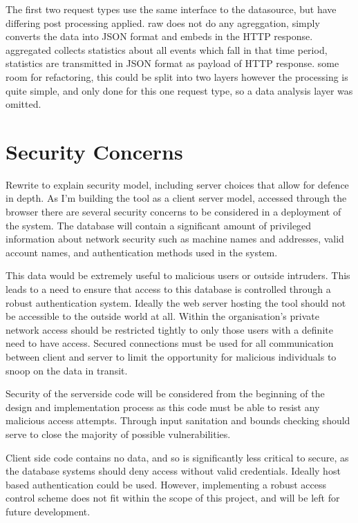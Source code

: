 The first two request types use the same interface to the datasource, but have differing post processing applied. raw does not do any agreggation, simply converts the data into JSON format and embeds in the HTTP response. aggregated collects statistics about all events which fall in that time period, statistics are transmitted in JSON format as payload of HTTP response.
some room for refactoring, this could be split into two layers
however the processing is quite simple, and only done for this one request type, so a data analysis layer was omitted.

\section{Security Concerns}
Rewrite to explain security model, including server choices that allow for defence in depth.
As I'm building the tool as a client server model, accessed through the browser
there are several security concerns to be considered in a deployment of the system.
The database will contain a significant amount of privileged information about network security
such as machine names and addresses, valid account names, and authentication methods used in the system.

This data would be extremely useful to malicious users or outside intruders. 
This leads to a need to ensure that access to this database is controlled through a robust authentication system.
Ideally the web server hosting the tool should not be accessible to the outside world at all. Within the organisation's private network access should be restricted tightly to only those users with a definite need to have access. 
Secured connections must be used for all communication between client and server to limit the opportunity for malicious individuals to snoop on the data in transit.

Security of the serverside code will be considered from the beginning of the design and implementation process
as this code must be able to resist any malicious access attempts. Through input sanitation and bounds checking should serve to close the majority of possible vulnerabilities.

Client side code contains no data, and so is significantly less critical to secure, as the database systems should deny access without valid credentials. Ideally host based authentication could be used. However, implementing a robust access control scheme does not fit within the scope of this project, and will be left for future development.


